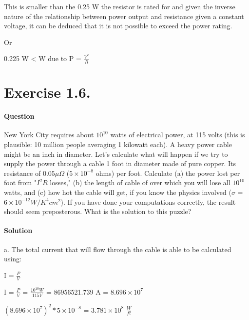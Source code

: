 \documentclass[a4paper, 12pt]{article}
\begin{document}
This is smaller than the 0.25 W the resistor is rated for and given the inverse nature of the relationship between power output and resistance given a constant voltage, it can be deduced that it is not possible to exceed the power rating.\newline

Or\newline

0.225 W \textless {} W due to P = $\frac{V^2}{R}$

\clearpage

\section{Exercise 1.6.}

\paragraph{Question\newline}

New York City requires about $10^10$ watts of electrical power, at 115 volts (this is plausible: 10 million people averaging 1 kilowatt each). A heavy power cable might be an inch in diameter. Let's calculate what will happen if we try to supply the power through a cable 1 foot in diameter made of pure copper. Its resistance of $0.05\mu\Omega$ ($5\times10^{-8}$ ohms) per foot. Calculate (a) the power lost per foot from "$I^2R$ losses," (b) the length of cable of over which you will lose all $10^{10}$ watts, and (c) how hot the cable will get, if you know the physics involved ($\sigma$ = $6\times10^{-12} W/K^{4}cm^{2}$). If you have done your computations correctly, the result should seem preposterous. What is the solution to this puzzle?

\paragraph{Solution\newline}

a. The total current that will flow through the cable is able to be calculated using:\newline

I = $\frac{P}{V}$\newline

I = $\frac{P}{V}$ = $\frac{10^{10} W}{115 V}$ = 86956521.739 A = $8.696\times10^7$\newline

$(8.696\times10^7)^2 * 5\times10^{-8}$ = $3.781\times10^8$ $\frac{W}{ft}$
\end{document}
